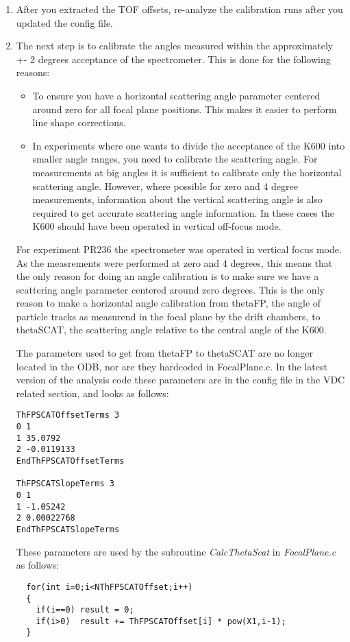 \documentclass[11pt]{report}
\begin{document}
\begin{enumerate}
\item 
After you extracted the TOF offsets, re-analyze the calibration runs after you updated the config file.

\item The next step is to calibrate the angles measured within the approximately +- 2 degrees
acceptance of the spectrometer. This is done for the following reasons:
\begin{itemize}
\item To ensure you have a horizontal scattering angle parameter centered around zero for
all focal plane positions. This makes it easier to perform line shape corrections.
\item In experiments where one wants to divide the acceptance of the K600 into smaller
angle ranges, you need to calibrate the scattering angle. For measurements at big angles
it is sufficient to calibrate only the horizontal scattering angle.  However, where possible
for zero and 4 degree measurements, information about the vertical scattering angle is
also required to get accurate scattering angle information. In these cases the K600 should have been
operated in vertical off-focus mode.
\end{itemize}

For experiment PR236 the spectrometer was operated in vertical focus mode. As the measrements
were performed at zero and 4 degrees, this means that the only reason for doing an angle
calibration is to make sure we have a scattering angle parameter centered around zero degrees.
This is the only reason to make a horizontal angle calibration from thetaFP,
the angle of particle tracks as measurend in the focal plane by the drift chambers,
to thetaSCAT, the scattering angle relative to the central angle of the K600. 

The parameters used to get from thetaFP to thetaSCAT 
are no longer located in the ODB, nor are they hardcoded in FocalPlane.c. 
In the latest version of the analysis code
these parameters are in the config file in the VDC related section, and looks as follows:

\begin{verbatim}
ThFPSCATOffsetTerms 3
0 1
1 35.0792
2 -0.0119133
EndThFPSCATOffsetTerms

ThFPSCATSlopeTerms 3
0 1
1 -1.05242
2 0.00022768
EndThFPSCATSlopeTerms
\end{verbatim}
%
These parameters are used by the subroutine {\it CalcThetaScat} in {\it FocalPlane.c} as follows: 
\begin{verbatim} 
  for(int i=0;i<NThFPSCATOffset;i++)
  {
    if(i==0) result = 0;
    if(i>0)  result += ThFPSCATOffset[i] * pow(X1,i-1); 
  }


\end{verbatim}
\end{enumerate}
\end{document}
